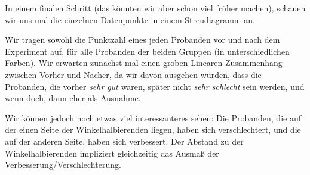 \documentclass[]{article}
\newenvironment{Shaded}{\begin{snugshade}}{\end{snugshade}}
\newcommand{\DataTypeTok}[1]{\textcolor[rgb]{0.13,0.29,0.53}{#1}}
\newcommand{\DecValTok}[1]{\textcolor[rgb]{0.00,0.00,0.81}{#1}}
\newcommand{\FloatTok}[1]{\textcolor[rgb]{0.00,0.00,0.81}{#1}}
\newcommand{\KeywordTok}[1]{\textcolor[rgb]{0.13,0.29,0.53}{\textbf{#1}}}
\newcommand{\NormalTok}[1]{#1}
\newcommand{\OperatorTok}[1]{\textcolor[rgb]{0.81,0.36,0.00}{\textbf{#1}}}
\newcommand{\StringTok}[1]{\textcolor[rgb]{0.31,0.60,0.02}{#1}}
\begin{document}
In einem finalen Schritt (das könnten wir aber schon viel früher
machen), schauen wir uns mal die einzelnen Datenpunkte in einem
Streudiagramm an.

Wir tragen sowohl die Punktzahl eines jeden Probanden vor und nach dem
Experiment auf, für alle Probanden der beiden Gruppen (in
unterschiedlichen Farben). Wir erwarten zunächst mal einen groben
Linearen Zusammenhang zwischen Vorher und Nacher, da wir davon ausgehen
würden, dass die Probanden, die vorher \emph{sehr gut} waren, später
nicht \emph{sehr schlecht} sein werden, und wenn doch, dann eher als
Ausnahme.

Wir können jedoch noch etwas viel interessanteres sehen: Die Probanden,
die auf der einen Seite der Winkelhalbierenden liegen, haben sich
verschlechtert, und die auf der anderen Seite, haben sich verbessert.
Der Abstand zu der Winkelhalbierenden impliziert gleichzeitig das Ausmaß
der Verbesserung/Verschlechterung.

\begin{Shaded}
\end{Shaded}
\end{document}
